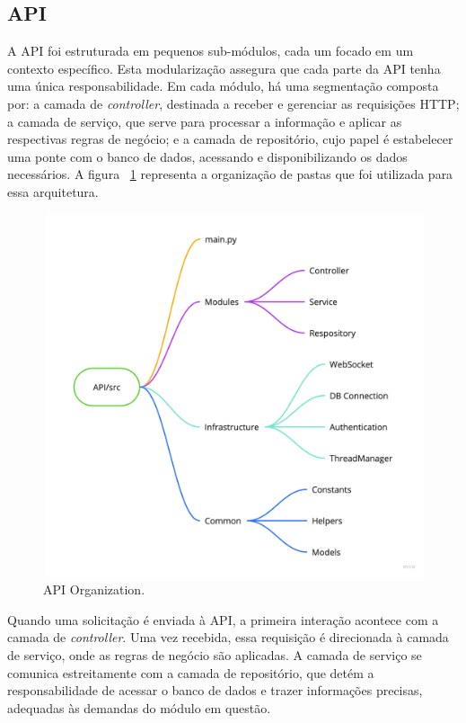 \subsection{API}\label{subsec:apiArchitecture}
A \gls{API} foi estruturada em pequenos sub-módulos, cada um focado em um contexto específico. Esta modularização assegura que cada parte da \gls{API} tenha uma única responsabilidade. Em cada módulo, há uma segmentação composta por: a camada de \textit{controller}, destinada a receber e gerenciar as requisições \gls{HTTP}; a camada de serviço, que serve para processar a informação e aplicar as respectivas regras de negócio; e a camada de repositório, cujo papel é estabelecer uma ponte com o banco de dados, acessando e disponibilizando os dados necessários. A figura ~\ref{fig:api_organization} representa a organização de pastas que foi utilizada para essa arquitetura.

\begin{figure}[htbp]
	\centering
	\includegraphics[width=\textwidth]{images/API_Organization.jpg}
	\caption{API Organization.}
	\label{fig:api_organization}
\end{figure}

Quando uma solicitação é enviada à \gls{API}, a primeira interação acontece com a camada de \textit{controller}. Uma vez recebida, essa requisição é direcionada à camada de serviço, onde as regras de negócio são aplicadas. A camada de serviço se comunica estreitamente com a camada de repositório, que detém a responsabilidade de acessar o banco de dados e trazer informações precisas, adequadas às demandas do módulo em questão.

